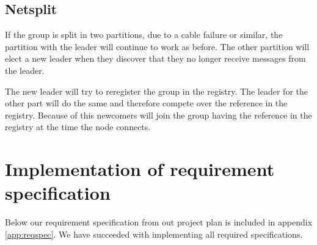 \documentclass[english]{article}
\begin{document}
\subsection{Netsplit}
If the group is split in two partitions, due to a cable failure or similar, the partition with the leader will continue to work as before. The other partition will elect a new leader when they discover that they no longer receive messages from the leader.

The new leader will try to reregister the group in the registry. The leader for the other part will do the same and therefore compete over the reference in the registry. Because of this newcomers will join the group having the reference in the registry at the time the node connects.

\section{Implementation of requirement specification}
Below our requirement specification from out project plan is included in appendix \vref{app:reqspec}. We have succeeded with implementing all required specifications. 

\end{document}
